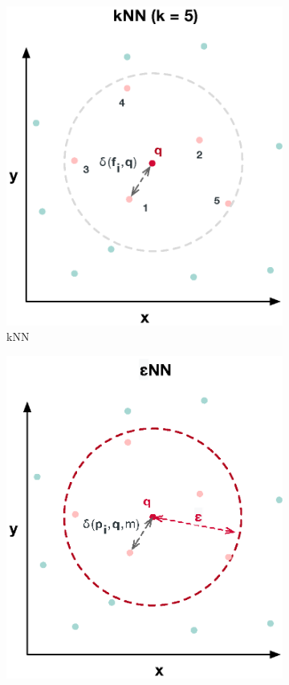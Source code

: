 \begin{figure}
    \centering
    \begin{subfigure}[b]{0.25\textwidth}
        \centering
        \includegraphics[width=\textwidth]{figures/knn}
        \caption{kNN}
        \label{fig:knn}
    \end{subfigure}
    \hfill
    \begin{subfigure}[b]{0.25\textwidth}
        \centering
        \includegraphics[width=\textwidth]{figures/enn}

\end{subfigure}
\end{figure}

